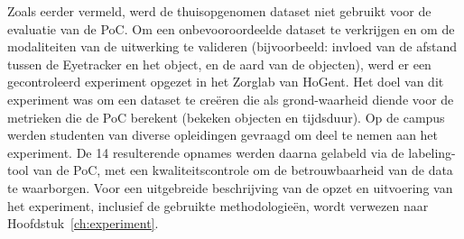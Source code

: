 Zoals eerder vermeld, werd de thuisopgenomen dataset niet gebruikt voor de evaluatie van de PoC. 
Om een onbevooroordeelde dataset te verkrijgen en om de modaliteiten van de uitwerking te valideren (bijvoorbeeld: invloed van de afstand tussen de Eyetracker en het object, en de aard van de objecten), werd er een gecontroleerd experiment opgezet in het Zorglab van HoGent.
Het doel van dit experiment was om een dataset te creëren die als grond-waarheid diende voor de metrieken die de PoC berekent (bekeken objecten en tijdsduur).
Op de campus werden studenten van diverse opleidingen gevraagd om deel te nemen aan het experiment.
De 14 resulterende opnames werden daarna gelabeld via de labeling-tool van de PoC, met een kwaliteitscontrole om de betrouwbaarheid van de data te waarborgen.
Voor een uitgebreide beschrijving van de opzet en uitvoering van het experiment, inclusief de gebruikte methodologieën, wordt verwezen naar Hoofdstuk~\ref{ch:experiment}.




